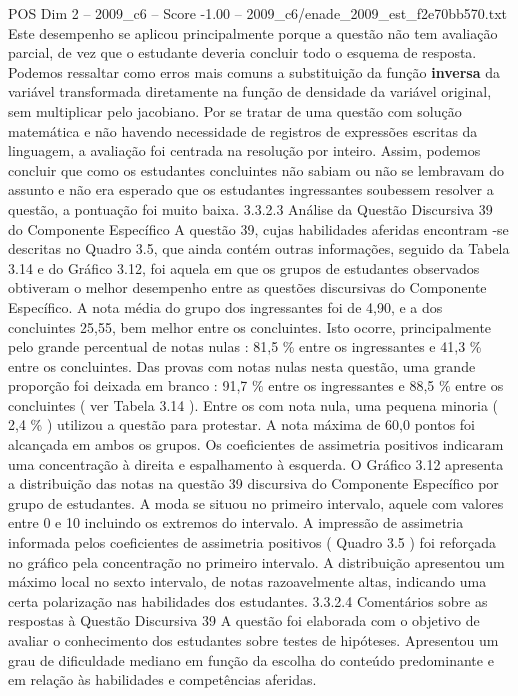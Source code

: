 \begin{textsample}{POS Dim 2 – 2009\_c6 – Score -1.00 – 2009\_c6/enade\_2009\_est\_f2e70bb570.txt}
Este desempenho se aplicou principalmente porque a questão não tem avaliação parcial, de vez que o estudante deveria concluir todo o esquema de resposta.
Podemos ressaltar como erros mais comuns a substituição da função \textbf{inversa} da variável transformada diretamente na função de densidade da variável original, sem multiplicar pelo jacobiano.
Por se tratar de uma questão com solução matemática e não havendo necessidade de registros de expressões escritas da linguagem, a avaliação foi centrada na resolução por inteiro.
Assim, podemos concluir que como os estudantes concluintes não sabiam ou não se lembravam do assunto e não era esperado que os estudantes ingressantes soubessem resolver a questão, a pontuação foi muito baixa. 3.3.2.3 Análise da Questão Discursiva 39 do Componente Específico A questão 39, cujas habilidades aferidas encontram -se descritas no Quadro 3.5, que ainda contém outras informações, seguido da Tabela 3.14 e do Gráfico 3.12, foi aquela em que os grupos de estudantes observados obtiveram o melhor desempenho entre as questões discursivas do Componente Específico.
A nota média do grupo dos ingressantes foi de 4,90, e a dos concluintes 25,55, bem melhor entre os concluintes.
Isto ocorre, principalmente pelo grande percentual de notas nulas : 81,5 \% entre os ingressantes e 41,3 \% entre os concluintes.
Das provas com notas nulas nesta questão, uma grande proporção foi deixada em branco : 91,7 \% entre os ingressantes e 88,5 \% entre os concluintes ( ver Tabela 3.14 ).
Entre os com nota nula, uma pequena minoria ( 2,4 \% ) utilizou a questão para protestar.
A nota máxima de 60,0 pontos foi alcançada em ambos os grupos.
Os coeficientes de assimetria positivos indicaram uma concentração à direita e espalhamento à esquerda.
O Gráfico 3.12 apresenta a distribuição das notas na questão 39 discursiva do Componente Específico por grupo de estudantes.
A moda se situou no primeiro intervalo, aquele com valores entre 0 e 10 incluindo os extremos do intervalo.
A impressão de assimetria informada pelos coeficientes de assimetria positivos ( Quadro 3.5 ) foi reforçada no gráfico pela concentração no primeiro intervalo.
A distribuição apresentou um máximo local no sexto intervalo, de notas razoavelmente altas, indicando uma certa polarização nas habilidades dos estudantes. 3.3.2.4 Comentários sobre as respostas à Questão Discursiva 39 A questão foi elaborada com o objetivo de avaliar o conhecimento dos estudantes sobre testes de hipóteses.
Apresentou um grau de dificuldade mediano em função da escolha do conteúdo predominante e em relação às habilidades e competências aferidas.

\end{textsample}
